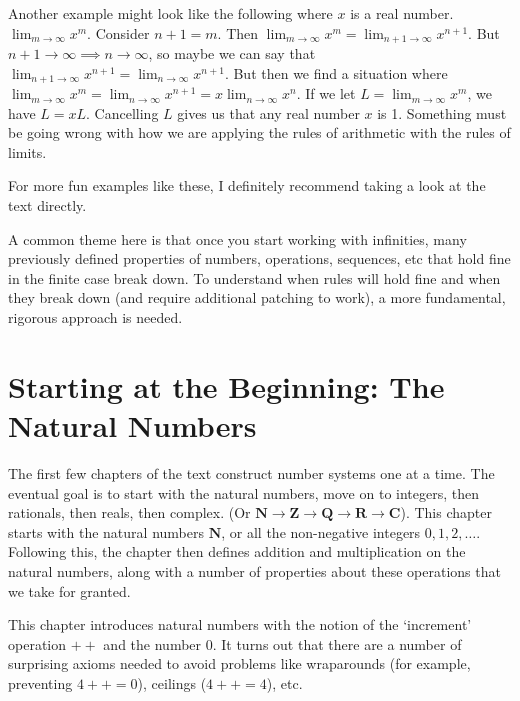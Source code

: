 \documentclass[answers,12pt]{exam}
\begin{document}
Another example might look like the following where $x$ is a real number.
$\lim_{m \rightarrow \infty} x^m$.
Consider $n+1 = m$.
Then $\lim_{m \rightarrow \infty} x^m = \lim_{n+1 \rightarrow \infty} x^{n+1}$.
But $n+1 \rightarrow \infty \implies n \rightarrow \infty$, so maybe we can say that $\lim_{n+1 \rightarrow \infty} x^{n+1} = \lim_{n \rightarrow \infty} x^{n+1}$.
But then we find a situation where $\lim_{m \rightarrow \infty} x^m =  \lim_{n \rightarrow \infty} x^{n+1} = x \lim_{n \rightarrow \infty} x^{n}$.
If we let $L = \lim_{m \rightarrow \infty} x^m $, we have $L = xL$.
Cancelling $L$ gives us that any real number $x$ is 1.
Something must be going wrong with how we are applying the rules of arithmetic with the rules of limits.

For more fun examples like these, I definitely recommend taking a look at the text directly.

A common theme here is that once you start working with infinities, many previously defined properties of numbers, operations, sequences, etc that hold fine in the finite case break down. 
To understand when rules will hold fine and when they break down (and require additional patching to work), a more fundamental, rigorous approach is needed.

\section{Starting at the Beginning: The Natural Numbers}
The first few chapters of the text construct number systems one at a time.
The eventual goal is to start with the natural numbers, move on to integers, then rationals, then reals, then complex. 
(Or $\mathbf{N} \rightarrow \mathbf{Z} \rightarrow \mathbf{Q} \rightarrow \mathbf{R} \rightarrow \mathbf{C}$). 
This chapter starts with the natural numbers $\mathbf{N}$, or all the non-negative integers $0, 1, 2, \dots$. 
Following this, the chapter then defines addition and multiplication on the natural numbers, along with a number of properties about these operations that we take for granted.

This chapter introduces natural numbers with the notion of the `increment' operation $++$ and the number 0.
It turns out that there are a number of surprising axioms needed to avoid problems like wraparounds (for example, preventing $4++ = 0$), ceilings ($4++ = 4$), etc.
\end{document}
